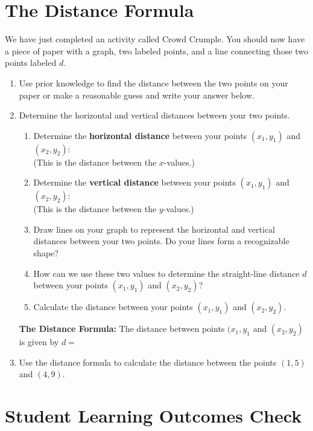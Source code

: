 \documentclass[11pt]{article}
\begin{document}
\section{The Distance Formula}
\noindent We have just completed an activity called Crowd Crumple.  You should now have a piece of paper with a graph, two labeled points, and a line connecting those two points labeled $d$.
\begin{enumerate}
\item Use prior knowledge to find the distance between the two points on your paper or make a reasonable guess and write your answer below.\\[.5in]

\item Determine the horizontal and vertical distances between your two points.
\begin{enumerate}
\item Determine the \textbf{horizontal distance} between your points $(x_1,y_1)$ and $(x_2,y_2)$:\\
(This is the distance between the $x$-values.)\\[.5in]
\item Determine the \textbf{vertical distance} between your points $(x_1,y_1)$ and $(x_2,y_2)$:\\
(This is the distance between the $y$-values.)\\[.5in]
\item Draw lines on your graph to represent the horizontal and vertical distances between your two points.  Do your lines form a recognizable shape?\\[.5in]
\item How can we use these two values to determine the straight-line distance $d$ between your points $(x_1,y_1)$ and $(x_2,y_2)$?\\[.5in]
\item Calculate the distance between your points $(x_1,y_1)$ and $(x_2,y_2)$.

\end{enumerate}
\vfill


\newpage


\noindent \textbf{The Distance Formula:}  The distance between points $(x_1,y_1$ and $(x_2,y_2)$ is given by $d=$

\vfill
\item Use the distance formula to calculate the distance between the points $(1,5)$ and $(4,9)$.
\end{enumerate}
\vfill
\vfill
\vfill
\section{Student Learning Outcomes Check}
\end{document}
